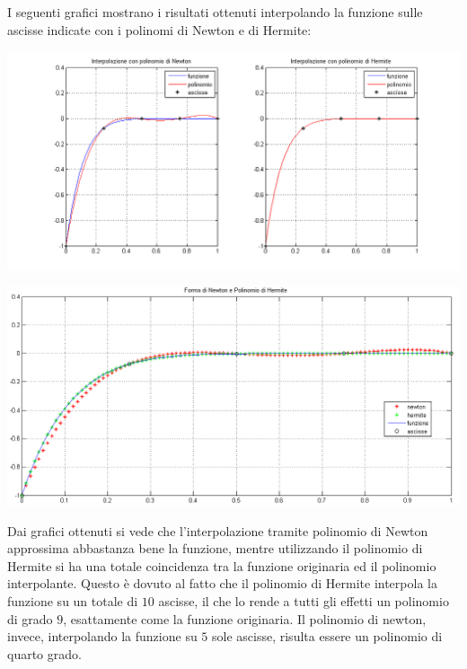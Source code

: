 \begin{sol}
	I seguenti grafici mostrano i risultati ottenuti interpolando la funzione sulle ascisse indicate con i polinomi di Newton e di Hermite:
	\begin{center}
		\includegraphics[scale=0.45]{img/es4_9a.png}
	\end{center}
	\begin{center}
		\includegraphics[scale=0.45]{img/es4_9b.png}
	\end{center}
	Dai grafici ottenuti si vede che l'interpolazione tramite polinomio di Newton approssima abbastanza bene
	la funzione, mentre utilizzando il polinomio di Hermite si ha una totale coincidenza tra la funzione originaria
	ed il polinomio interpolante. Questo è dovuto al fatto che il polinomio di Hermite interpola la funzione
	su un totale di $10$ ascisse, il che lo rende a tutti gli effetti un polinomio di grado $9$, esattamente
	come la funzione originaria.
	Il polinomio di newton, invece, interpolando la funzione su $5$ sole ascisse, risulta essere un polinomio di quarto grado.
	
\end{sol}

